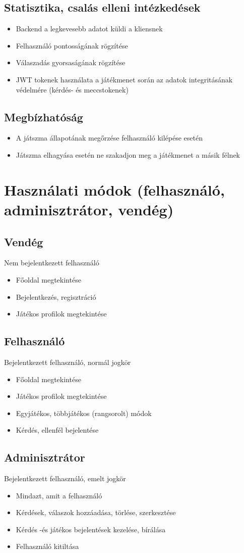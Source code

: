 \subsection*{Statisztika, csalás elleni intézkedések}
\begin{itemize}
    \item Backend a legkevesebb adatot küldi a kliensnek
    \item Felhasználó pontosságának rögzítése
    \item Válaszadás gyorsaságának rögzítése
    \item JWT tokenek használata a játékmenet során az adatok integritásának védelmére (kérdés- és meccstokenek)
\end{itemize}
\subsection*{Megbízhatóság}
\begin{itemize}
    \item A játszma állapotának megőrzése felhasználó kilépése esetén
    \item Játszma elhagyása esetén ne szakadjon meg a játékmenet a másik félnek
\end{itemize}

\newpage
\section{Használati módok (felhasználó, adminisztrátor, vendég)}
\subsection*{Vendég}
Nem bejelentkezett felhasználó
\begin{itemize}
    \item Főoldal megtekintése
    \item Bejelentkezés, regisztráció
    \item Játékos profilok megtekintése
\end{itemize}

\subsection*{Felhasználó}
Bejelentkezett felhasználó, normál jogkör
\begin{itemize}
    \item Főoldal megtekintése
    \item Játékos profilok megtekintése
    \item Egyjátékos, többjátékos (rangsorolt) módok
    \item Kérdés, ellenfél bejelentése
\end{itemize}

\subsection*{Adminisztrátor}
Bejelentkezett felhasználó, emelt jogkör
\begin{itemize}
    \item Mindazt, amit a felhasználó
    \item Kérdések, válaszok hozzáadása, törlése, szerkesztése
    \item Kérdés -és játékos bejelentések kezelése, bírálása
    \item Felhasználó kitiltása
\end{itemize}

